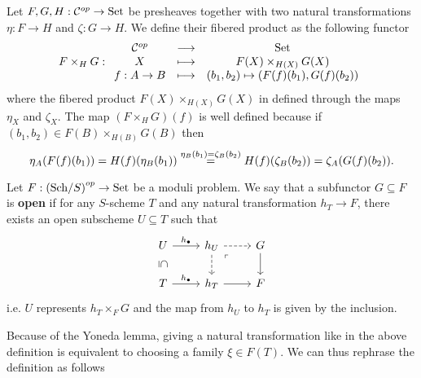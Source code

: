 \begin{definition}
Let $F,G,H:\Cc\op\to\Set$ be presheaves together with two natural transformations $\eta:F\to H$ and $\zeta:G\to H$. We define their fibered product as the following functor
\[F\times_H G:\functorDef{\Cc\op}{\Set}{X}{F(X)\times_{H(X)}G(X)}{f:A\to B}{(b_1,b_2)\mapsto(F(f)(b_1),G(f)(b_2))}\]
where the fibered product $F(X)\times_{H(X)}G(X)$ in defined through the maps $\eta_X$ and $\zeta_X$. The map $(F\times_H G)(f)$ is well defined because if $(b_1,b_2)\in F(B)\times_{H(B)}G(B)$ then 
\[\eta_A(F(f)(b_1))=H(f)(\eta_B(b_1))\pasgnlmath={\eta_B(b_1)=\zeta_B(b_2)}H(f)(\zeta_B(b_2))=\zeta_A(G(f)(b_2)).\]
\end{definition}

\begin{definition}
Let $F:\Psh S\Set$ be a moduli problem. We say that a subfunctor $G\subseteq F$ is \textbf{open} if for any $S$-scheme $T$ and any natural transformation $h_T\to F$, there exists an open subscheme $U\subseteq T$ such that
\[\begin{tikzcd}
	U & {h_U} & G \\
	T & {h_T} & F
	\arrow["\yo", from=1-1, to=1-2]
	\arrow["\subseteq"{marking, allow upside down}, draw=none, from=1-1, to=2-1]
	\arrow[dashed, from=1-2, to=1-3]
	\arrow[dashed, from=1-2, to=2-2]
	\arrow["\ulcorner"{anchor=center, pos=0.125}, draw=none, from=1-2, to=2-3]
	\arrow[from=1-3, to=2-3]
	\arrow["\yo", from=2-1, to=2-2]
	\arrow[from=2-2, to=2-3]
\end{tikzcd}\]
i.e. $U$ represents $h_T\times_F G$ and the map from $h_U$ to $h_T$ is given by the inclusion.
\end{definition}

Because of the Yoneda lemma, giving a natural transformation like in the above definition is equivalent to choosing a family $\xi\in F(T)$. We can thus rephrase the definition as follows

